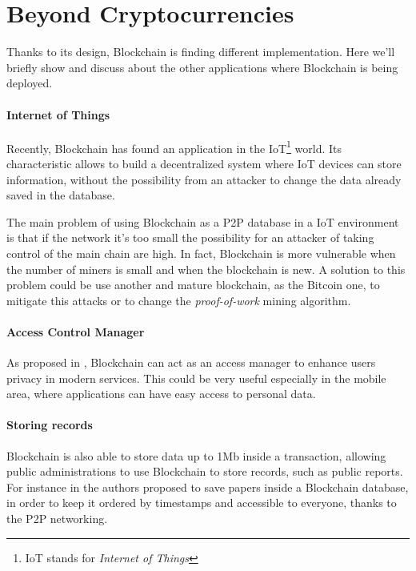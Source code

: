 \section{Beyond Cryptocurrencies}
\label{sec:beyond_crypto}

Thanks to its design, Blockchain is finding different implementation. Here
we'll briefly show and discuss about the other applications where Blockchain is
being deployed.

\paragraph*{Internet of Things}

Recently, Blockchain has found an application in the IoT\footnote{IoT stands
for \textit{Internet of Things}} world\cite{politecnico16}. Its characteristic
allows to build a decentralized system where IoT devices can store information,
without the possibility from an attacker to change the data already saved in
the database\cite{politecnico16}.

The main problem of using Blockchain as a P2P database in a IoT environment is
that if the network it's too small the possibility for an attacker of taking
control of the main chain are high. In fact, Blockchain is more vulnerable when
the number of miners is small and when the blockchain is new. A solution to
this problem could be use another and mature blockchain, as the Bitcoin one, to
mitigate this attacks or to change the \textit{proof-of-work} mining algorithm.

\paragraph*{Access Control Manager}

As proposed in \cite{dp15}, Blockchain can act as an access manager to enhance
users privacy in modern services. This could be very useful especially in the
mobile area, where applications can have easy access to personal data.

\paragraph*{Storing records}

Blockchain is also able to store data up to 1Mb \cite{ectel16} inside a
transaction, allowing public administrations to use Blockchain to store
records, such as public reports. For instance in \cite{ectel16} the authors
proposed to save papers inside a Blockchain database, in order to keep it
ordered by timestamps and accessible to everyone, thanks to the P2P networking.
